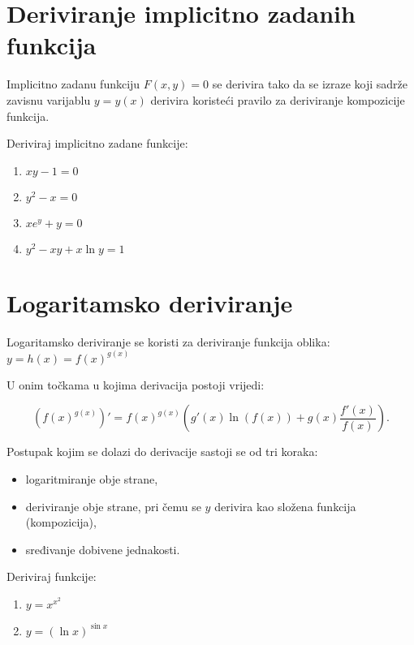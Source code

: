 \section{Deriviranje implicitno zadanih funkcija}

Implicitno zadanu funkciju $F(x,y) = 0$ se derivira tako da se izraze koji sadrže
zavisnu varijablu $y=y(x)$ derivira koristeći pravilo za deriviranje kompozicije
funkcija.

\begin{examplebox}
    Deriviraj implicitno zadane funkcije:

    \begin{enumerate}
        \item $xy-1=0$
        \item $y^2-x=0$
        \item $xe^y+y=0$
        \item $y^2-xy+x\ln y = 1$
    \end{enumerate}
\end{examplebox}

\section{Logaritamsko deriviranje}

Logaritamsko deriviranje se koristi za deriviranje funkcija oblika: $\displaystyle
y=h(x)=f(x)^{g(x)}
$

U onim točkama u kojima derivacija postoji vrijedi:

$$
\left(f(x)^{g(x)}\right)' = f(x)^{g(x)}\left(g'(x)\ln(f(x))+g(x)\frac{f'(x)}{f(x)}\right).
$$

Postupak kojim se dolazi do derivacije sastoji se od tri koraka:
\begin{itemize}
    \item logaritmiranje obje strane,
    \item deriviranje obje strane, pri čemu se $y$ derivira kao složena funkcija (kompozicija),
    \item sređivanje dobivene jednakosti.
\end{itemize}

\begin{examplebox}
    Deriviraj funkcije:

    \begin{enumerate}
        \item $y=x^{x^2}$
        \item $y=(\ln x)^{\sin x}$
    \end{enumerate}
\end{examplebox}

